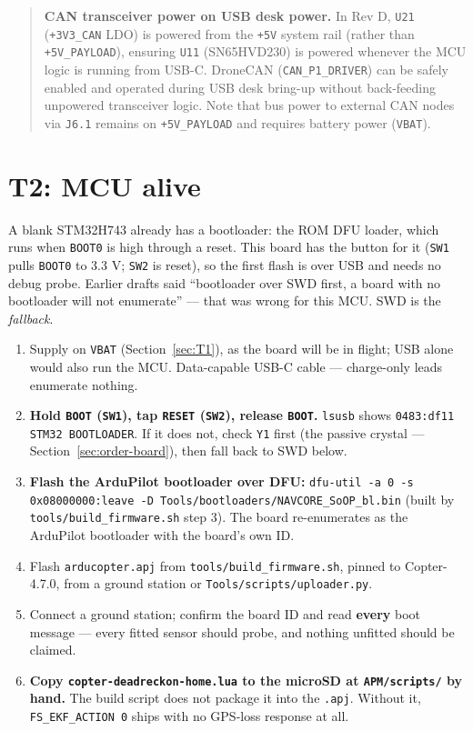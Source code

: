 \documentclass[11pt,a4paper]{article}
\newcommand{\file}[1]{\texttt{\small #1}}
\newcommand{\cmd}[1]{\texttt{\small #1}}
\newcommand{\flag}[1]{\textcolor{warnred}{\textbf{#1}}}
\begin{document}
\begin{quote}
\textbf{CAN transceiver power on USB desk power.}
In Rev D, \file{U21} (\file{+3V3\_CAN} LDO) is powered from the \file{+5V} system rail (rather than \file{+5V\_PAYLOAD}), ensuring \file{U11} (SN65HVD230) is powered whenever the MCU logic is running from USB-C. DroneCAN (\file{CAN\_P1\_DRIVER}) can be safely enabled and operated during USB desk bring-up without back-feeding unpowered transceiver logic. Note that bus power to external CAN nodes via \file{J6.1} remains on \file{+5V\_PAYLOAD} and requires battery power (\file{VBAT}).
\end{quote}

\section{T2: MCU alive}

A blank STM32H743 already has a bootloader: the ROM DFU loader, which runs when
\file{BOOT0} is high through a reset. This board has the button for it (\file{SW1} pulls
\file{BOOT0} to 3.3 V; \file{SW2} is reset), so the first flash is over USB and needs no
debug probe. Earlier drafts said ``bootloader over SWD first, a board with no bootloader
will not enumerate'' --- that was wrong for this MCU. SWD is the \emph{fallback}.

\begin{enumerate}
\item Supply on \file{VBAT} (Section~\ref{sec:T1}), as the board will be in flight; USB alone
would also run the MCU. Data-capable USB-C cable --- charge-only leads enumerate nothing.
\item \textbf{Hold \file{BOOT} (\file{SW1}), tap \file{RESET} (\file{SW2}), release \file{BOOT}.}
\cmd{lsusb} shows \file{0483:df11 STM32 BOOTLOADER}. If it does not, check \file{Y1} first
(the passive crystal --- Section~\ref{sec:order-board}), then fall back to SWD below.
\item \textbf{Flash the ArduPilot bootloader over DFU:}
\cmd{dfu-util -a 0 -s 0x08000000:leave -D Tools/bootloaders/NAVCORE\_SoOP\_bl.bin}
(built by \file{tools/build\_firmware.sh} step 3). The board re-enumerates as the ArduPilot
bootloader with the board's own ID.
\item Flash \file{arducopter.apj} from \file{tools/build\_firmware.sh}, pinned to
Copter-4.7.0, from a ground station or \cmd{Tools/scripts/uploader.py}.
\item Connect a ground station; confirm the board ID and read \textbf{every} boot message
--- every fitted sensor should probe, and nothing unfitted should be claimed.
\item \flag{Copy \file{copter-deadreckon-home.lua} to the microSD at \file{APM/scripts/} by
hand.} The build script does not package it into the \file{.apj}. Without it,
\file{FS\_EKF\_ACTION 0} ships with no GPS-loss response at all.
\end{enumerate}
\end{document}
